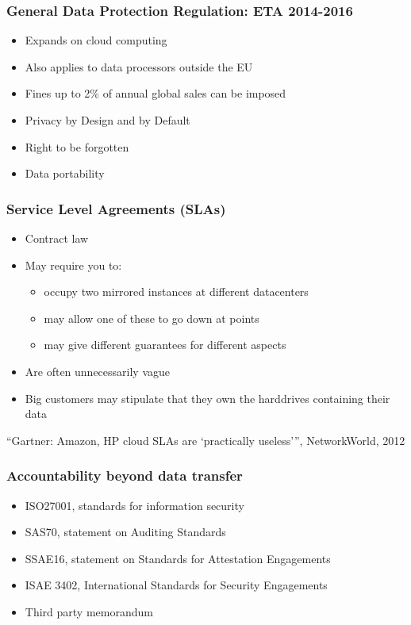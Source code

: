 \documentclass{beamer}
\begin{document}
\begin{frame}
    \frametitle{General Data Protection Regulation: ETA 2014-2016}
    \begin{itemize}
    \item Expands on cloud computing
    \item Also applies to data processors outside the EU
    \item Fines up to 2\% of annual global sales can be imposed
    \end{itemize}

    \begin{itemize}
    \item Privacy by Design and by Default
    \item Right to be forgotten
    \item Data portability
    \end{itemize}
\end{frame}

\begin{frame}
    \frametitle{Service Level Agreements (SLAs)}
    \begin{itemize}
    \item Contract law
    \item May require you to:
      \begin{itemize} %
        \item occupy two mirrored instances at different datacenters
        \item may allow one of these to go down at points
        \item may give different guarantees for different aspects
      \end{itemize}
    \item Are often unnecessarily vague
    \item Big customers may stipulate that they own the harddrives containing their data
    \end{itemize}
    \footnotesize{``Gartner: Amazon, HP cloud SLAs are `practically useless''', NetworkWorld, 2012}
\end{frame}

\begin{frame}
    \frametitle{Accountability beyond data transfer}
    \begin{itemize}
    \item ISO27001, standards for information security
    \item SAS70, statement on Auditing Standards
    \item SSAE16, statement on Standards for Attestation Engagements
    \item ISAE 3402, International Standards for Security Engagements
    \item Third party memorandum
    \end{itemize}
\end{frame}
\end{document}
